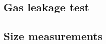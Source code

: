 \documentclass[a4paper]{article}
\begin{document}
\begin{appendices}
\subsection{Gas leakage test}


\subsection{Size measurements}
{

}


\end{appendices}


\clearpage
\printbibliography
\end{document}
